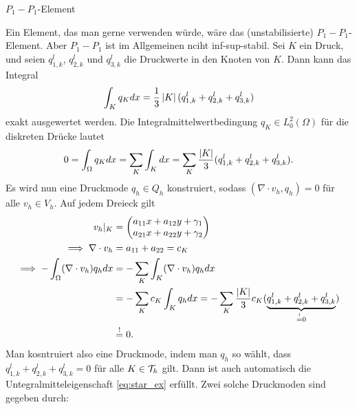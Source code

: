 \begin{beispiel*} $P_{1}-P_{1}$-Element

Ein Element, das man gerne verwenden würde, wäre das (unstabilisierte) $P_{1}-P_{1}$-Element. Aber $P_{1}-P_{1}$ ist im Allgemeinen nciht inf-sup-stabil. Sei $K$ ein Druck, und seien $q_{1, k}^{l}$, $q_{2, k}^{l}$ und $q_{3, k}^{l}$ die Druckwerte in den Knoten von $K$. Dann kann das Integral
\begin{align*}
  \int_{K} q_{K} dx = \frac 1 3 \left|K\right| (q_{1, k}^{l} + q_{2, k}^{l} + q_{3, k}^{l})
\end{align*}
exakt ausgewertet werden. Die Integralmittelwertbedingung $q_{K} \in L_{0}^{2}(\Omega)$ für die diskreten Drücke lautet
\begin{align}\label{eq:star_ex}
  0 = \int_{\Omega} q_{K} dx = \sum_{K}\int_{K} dx = \sum_{K} \frac {\left|K\right|} 3 (q_{1, k}^{l} + q_{2, k}^{l} + q_{3, k}^{l}). 
\end{align}
Es wird nun eine Druckmode $q_{h} \in Q_{h}$ konstruiert, sodass $(\nabla\cdot v_{h}, q_{h}) = 0$ für alle $v_{h} \in V_{h}$. 
Auf jedem Dreieck gilt
\begin{align*}  
v_{h}|_{K} &=
\begin{pmatrix}
  a_{11} x + a_{12}y + \gamma_{1}\\ a_{21}x + a_{22}y + \gamma_{2}
\end{pmatrix}\\
\implies \nabla\cdot v_{h} &= a_{11} + a_{22} = c_{K}\\
\implies - \int_{\Omega} (\nabla\cdot v_{h}) q_{h} dx &= - \sum_{K} \int_{K} (\nabla\cdot v_{h}) q_{h} dx\\
&= - \sum_{K} c_{K} \int_{K} q_{h}dx = - \sum_{K} \frac{\left|K\right|} 3 c_{K}(\underbrace{q_{1, k}^{l} + q_{2, k}^{l} + q_{3, k}^{l}}_{\stackrel ! =  0})\\
& \stackrel ! = 0. 
\end{align*}
Man kosntruiert also eine Druckmode, indem man $q_{h}$ so wählt, dass $q_{1, k}^{l} + q_{2, k}^{l} + q_{3, k}^{l} = 0 $ für alle $K \in {\cal T}_{h}$ gilt. Dann ist auch automatisch die Untegralmitteleigenschaft \eqref{eq:star_ex} erfüllt. 
Zwei solche Druckmoden sind gegeben durch: 

\begin{figure}[h!]
  \centering
\end{figure}
\end{beispiel*}
